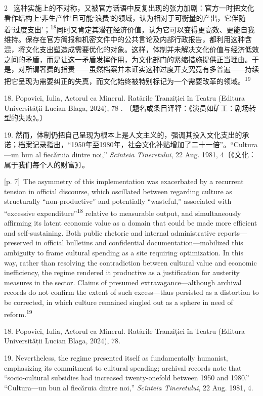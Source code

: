 \documentclass[10pt,a4paper]{article}
\begin{document}
\begin{paracol}{2}
\switchcolumn*
{\scriptsize\color{gray} [p. 7]}\ 这种实施上的不对称，又被官方话语中反复出现的张力加剧：官方一时把文化看作结构上‘非生产性’且可能‘浪费’的领域，认为相对于可衡量的产出，它伴随着‘过度支出’；\nobreak\textsuperscript{18}同时又肯定其潜在经济价值，认为它可以变得更高效、更能自我维持。保存在官方简报和机密文件中的公共言论及内部行政报告，都利用这种含混，将文化支出塑造成需要优化的对象。这样，体制并未解决文化价值与经济低效之间的矛盾，而是让这一矛盾发挥作用，为文化部门的紧缩措施提供正当理由。于是，对所谓奢费的指责——虽然档案并未证实这种过度开支究竟有多普遍——持续把它呈现为需要纠正的失真，而文化始终被特别标记为一个需要改革的领\mbox{域。\textsuperscript{19}}\par{\small 18. Popovici, Iulia, Actorul ca Minerul. Ratările Tranziției în Teatru (Editura Universității Lucian Blaga, 2024), 78 . 〔题名或条目译释：《演员如矿工：剧场转型的失败》。〕\par}{\small 19. 然而，体制仍把自己呈现为根本上是人文主义的，强调其投入文化支出的承诺；档案记录指出，“1950年至1980年，社会文化补贴增加了二十一倍”。“Cultura—un bun al fiecăruia dintre noi,” \textit{Scînteia Tineretului}, 22 Aug. 1981, 4〔《文化：属于我们每个人的财富》〕。\par}
\switchcolumn
{\scriptsize\color{gray} [p. 7]}\ The asymmetry of this implementation was exacerbated by a recurrent tension in official discourse, which oscillated between regarding culture as structurally “non-productive” and potentially “wasteful,” associated with “excessive expenditure”\nobreak\textsuperscript{18} relative to measurable output, and simultaneously affirming its latent economic value as a domain that could be made more efficient and self-sustaining. Both public rhetoric and internal administrative reports—preserved in official bulletins and confidential documentation—mobilized this ambiguity to frame cultural spending as a site requiring optimization. In this way, rather than resolving the contradiction between cultural value and economic inefficiency, the regime rendered it productive as a justification for austerity measures in the sector. Claims of presumed extravagance—although archival records do not confirm the extent of such excess—thus persisted as a distortion to be corrected, in which culture remained singled out as a sphere in need of reform.\nobreak\textsuperscript{19}\par{\small 18. Popovici, Iulia, Actorul ca Minerul. Ratările Tranziției în Teatru (Editura Universității Lucian Blaga, 2024), 78.\par}{\small 19. Nevertheless, the regime presented itself as fundamentally humanist, emphasizing its commitment to cultural spending; archival records note that “socio-cultural subsidies had increased twenty-onefold between 1950 and 1980.” “Cultura—un bun al fiecăruia dintre noi,” \textit{Scînteia Tineretului}, 22 Aug. 1981, 4.\par}

\end{paracol}
\end{document}
